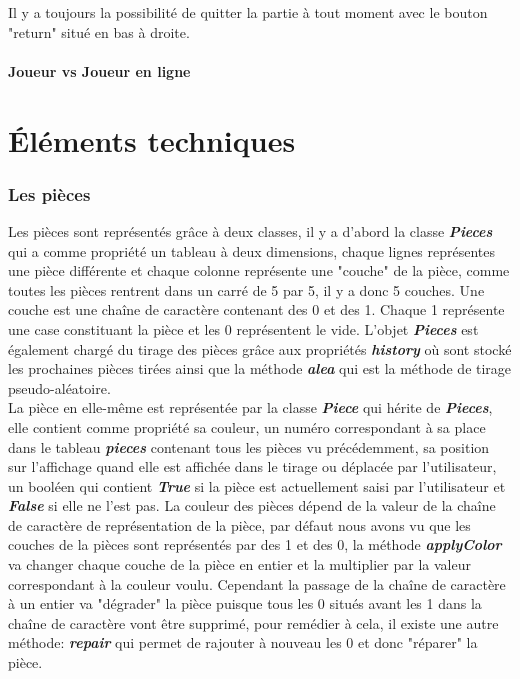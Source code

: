 \documentclass[a4paper]{report}
\begin{document}
Il y a toujours la possibilité de quitter la partie à tout moment avec le bouton "return" situé en bas à droite.
\subsection{Joueur vs Joueur en ligne}

\part{Éléments techniques}

\section{Les pièces}
Les pièces sont représentés grâce à deux classes, il y a d'abord la classe \textbf{\textit{Pieces}} qui a comme propriété un tableau à deux dimensions, chaque lignes représentes une pièce différente et chaque colonne représente une "couche" de la pièce, comme toutes les pièces rentrent dans un carré de 5 par 5, il y a donc 5 couches. Une couche est une chaîne de caractère contenant des 0 et des 1. Chaque 1 représente une case constituant la pièce et les 0 représentent le vide. L'objet \textbf{\textit{Pieces}} est également chargé du tirage des pièces grâce aux propriétés \textbf{\textit{history}} où sont stocké les prochaines pièces tirées ainsi que la méthode \textbf{\textit{alea}} qui est la méthode de tirage pseudo-aléatoire. \\

La pièce en elle-même est représentée par la classe \textbf{\textit{Piece}} qui hérite de \textbf{\textit{Pieces}}, elle contient comme propriété sa couleur, un numéro correspondant à sa place dans le tableau \textbf{\textit{pieces}} contenant tous les pièces vu précédemment, sa position sur l'affichage quand elle est affichée dans le tirage ou déplacée par l'utilisateur, un booléen qui contient \textbf{\textit{True}} si la pièce est actuellement saisi par l'utilisateur et \textbf{\textit{False}} si elle ne l'est pas. La couleur des pièces dépend de la valeur de la chaîne de caractère de représentation de la pièce, par défaut nous avons vu que les couches de la pièces sont représentés par des 1 et des 0, la méthode \textbf{\textit{applyColor}} va changer chaque couche de la pièce en entier et la multiplier par la valeur correspondant à la couleur voulu. Cependant la passage de la chaîne de caractère à un entier va "dégrader" la pièce puisque tous les 0 situés avant les 1 dans la chaîne de caractère vont être supprimé, pour remédier à cela, il existe une autre méthode: \textbf{\textit{repair}} qui permet de rajouter à nouveau les 0 et donc "réparer" la pièce.
\end{document}
